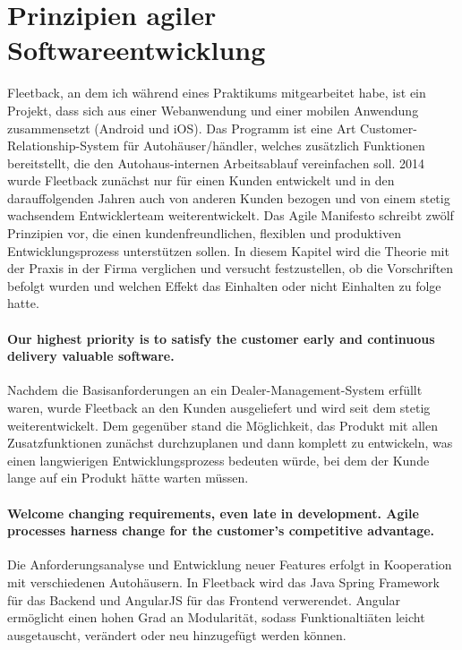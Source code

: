 \documentclass[ngerman]{scrartcl}
\begin{document}
\section{Prinzipien agiler Softwareentwicklung\cite{2003asd}}
Fleetback, an dem ich während eines Praktikums mitgearbeitet habe, ist ein Projekt, dass sich aus einer Webanwendung und einer mobilen Anwendung zusammensetzt (Android und iOS). Das Programm ist eine Art Customer-Relationship-System für Autohäuser/händler, welches zusätzlich Funktionen bereitstellt, die den Autohaus-internen Arbeitsablauf vereinfachen soll. 2014 wurde Fleetback zunächst nur für einen Kunden entwickelt und in den darauffolgenden Jahren auch von anderen Kunden bezogen und von einem stetig wachsendem Entwicklerteam weiterentwickelt. Das Agile Manifesto schreibt zwölf Prinzipien vor, die einen kundenfreundlichen, flexiblen und produktiven Entwicklungsprozess unterstützen sollen. In diesem Kapitel wird die Theorie mit der Praxis in der Firma verglichen und versucht festzustellen, ob die Vorschriften befolgt wurden und welchen Effekt das Einhalten oder nicht Einhalten zu folge hatte.   
\paragraph{Our highest priority is to satisfy the customer early and continuous delivery valuable software.}
Nachdem die Basisanforderungen an ein Dealer-Management-System erfüllt waren, wurde Fleetback an den Kunden ausgeliefert und wird seit dem stetig weiterentwickelt. Dem gegenüber stand die Möglichkeit, das Produkt mit allen Zusatzfunktionen zunächst durchzuplanen und dann komplett zu entwickeln, was einen langwierigen Entwicklungsprozess bedeuten würde, bei dem der Kunde lange auf ein Produkt hätte warten müssen. 


\paragraph{Welcome changing requirements, even late in development. Agile processes harness change for the customer's competitive advantage.}
Die Anforderungsanalyse und Entwicklung neuer Features erfolgt in Kooperation mit verschiedenen Autohäusern. In Fleetback wird das Java Spring Framework für das Backend und AngularJS für das Frontend verwerendet. Angular ermöglicht einen hohen Grad an Modularität, sodass Funktionaltiäten leicht ausgetauscht, verändert oder neu hinzugefügt werden können.  
\end{document}
